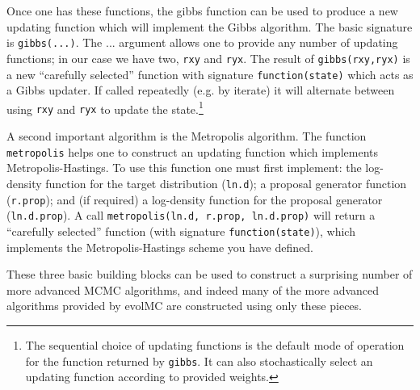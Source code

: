 \documentclass[12pt]{article}\usepackage[]{graphicx}\usepackage[]{color}
\begin{document}
Once one has these functions, the gibbs function can be used to
produce a new updating function which will implement the Gibbs
algorithm. The basic signature is {\tt gibbs(...)}. The ...  argument
allows one to provide any number of updating functions; in our case we
have two, {\tt rxy} and {\tt ryx}. The result of {\tt gibbs(rxy,ryx)}
is a new ``carefully selected'' function with signature
\texttt{function(state)} which acts as a Gibbs updater. If called
repeatedly (e.g. by iterate) it will alternate between using {\tt rxy}
and {\tt ryx} to update the state.\footnote{The sequential choice of
  updating functions is the default mode of operation for the function
  returned by {\tt gibbs}. It can also stochastically select an
  updating function according to provided weights.}

A second important algorithm is the Metropolis algorithm. The function
{\tt metropolis} helps one to construct an updating function which
implements Metropolis-Hastings. To use this function one must first implement:
the log-density function for the target distribution ({\tt ln.d}); a proposal
generator function ({\tt r.prop}); and (if required) a log-density function for the
proposal generator ({\tt ln.d.prop}). A call {\tt metropolis(ln.d,
  r.prop, ln.d.prop)} will return a ``carefully selected'' function
(with signature {\tt function(state)}), which implements the
Metropolis-Hastings scheme you have defined.

These three basic building blocks can be used to construct a surprising
number of more advanced MCMC algorithms, and indeed many of the more
advanced algorithms provided by evolMC are constructed using only these pieces.
\end{document}
